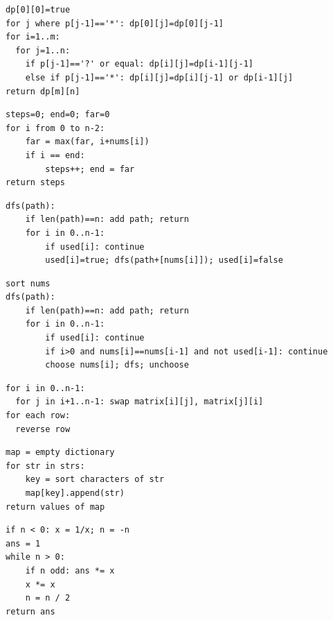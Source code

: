\documentclass[11pt,a4paper]{ctexart}
\begin{document}
\begin{verbatim}
dp[0][0]=true
for j where p[j-1]=='*': dp[0][j]=dp[0][j-1]
for i=1..m:
  for j=1..n:
    if p[j-1]=='?' or equal: dp[i][j]=dp[i-1][j-1]
    else if p[j-1]=='*': dp[i][j]=dp[i][j-1] or dp[i-1][j]
return dp[m][n]
\end{verbatim}

\begin{verbatim}
steps=0; end=0; far=0
for i from 0 to n-2:
    far = max(far, i+nums[i])
    if i == end:
        steps++; end = far
return steps
\end{verbatim}

\begin{verbatim}
dfs(path):
    if len(path)==n: add path; return
    for i in 0..n-1:
        if used[i]: continue
        used[i]=true; dfs(path+[nums[i]]); used[i]=false
\end{verbatim}

\begin{verbatim}
sort nums
dfs(path):
    if len(path)==n: add path; return
    for i in 0..n-1:
        if used[i]: continue
        if i>0 and nums[i]==nums[i-1] and not used[i-1]: continue
        choose nums[i]; dfs; unchoose
\end{verbatim}

\begin{verbatim}
for i in 0..n-1:
  for j in i+1..n-1: swap matrix[i][j], matrix[j][i]
for each row:
  reverse row
\end{verbatim}

\begin{verbatim}
map = empty dictionary
for str in strs:
    key = sort characters of str
    map[key].append(str)
return values of map
\end{verbatim}

\begin{verbatim}
if n < 0: x = 1/x; n = -n
ans = 1
while n > 0:
    if n odd: ans *= x
    x *= x
    n = n / 2
return ans
\end{verbatim}
\end{document}
